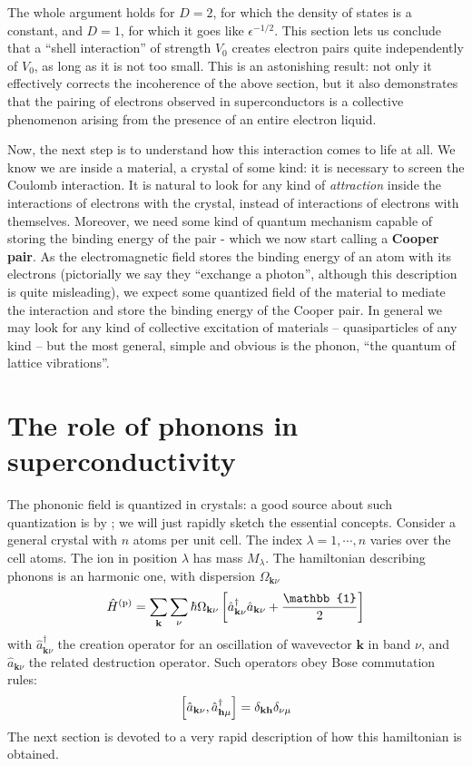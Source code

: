 The whole argument holds for $D=2$, for which the density of states is a constant, and $D=1$, for which it goes like $\epsilon^{-1/2}$. This section lets us conclude that a ``shell interaction'' of strength $V_0$ creates electron pairs quite independently of $V_0$, as long as it is not too small. This is an astonishing result: not only it effectively corrects the incoherence of the above section, but it also demonstrates that the pairing of electrons observed in superconductors is a collective phenomenon arising from the presence of an entire electron liquid.

Now, the next step is to understand how this interaction comes to life at all. We know we are inside a material, a crystal of some kind: it is necessary to screen the Coulomb interaction. It is natural to look for any kind of \textit{attraction} inside the interactions of electrons with the crystal, instead of interactions of electrons with themselves. Moreover, we need some kind of quantum mechanism capable of storing the binding energy of the pair - which we now start calling a \textbf{Cooper pair}. As the electromagnetic field stores the binding energy of an atom with its electrons (pictorially we say they ``exchange a photon'', although this description is quite misleading), we expect some quantized field of the material to mediate the interaction and store the binding energy of the Cooper pair. In general we may look for any kind of collective excitation of materials -- quasiparticles of any kind -- but the most general, simple and obvious is the phonon, ``the quantum of lattice vibrations''.

\section{The role of phonons in superconductivity}

The phononic field is quantized in crystals: a good source about such quantization is  \cite{grosso2000solid} by \citeauthor{grosso2000solid}; we will just rapidly sketch the essential concepts.
Consider a general crystal with $n$ atoms per unit cell. The index $\lambda = 1,\cdots,n$ varies over the cell atoms. The ion in position $\lambda$ has mass $M_\lambda$. The hamiltonian describing phonons is an harmonic one, with dispersion $\Omega_{\mathbf{k}\nu}$
\begin{equation}\label{eq:born-oppenheimer phonon hamiltonian}
	\hat H^{(\mathrm{p})} = \sum_\mathbf{k} \sum_\nu  \hbar \Omega_{\mathbf{k}\nu} \lrS{\hat a_{\mathbf{k}\nu}^\dagger \hat a_{\mathbf{k}\nu} + \frac{\mathbb{1}}{2}}
\end{equation}
with $\hat a_{\mathbf{k}\nu}^\dagger$ the creation operator for an oscillation of wavevector $\mathbf{k}$ in band $\nu$, and $\hat a_{\mathbf{k}\nu}$ the related destruction operator.  Such operators obey Bose commutation rules:
\[
	\comm{\hat a_{\mathbf{k}\nu}}{ \hat a_{\mathbf{h}\mu}^\dagger} = \delta_{\mathbf{k}\mathbf{h}}
	\delta_{\nu\mu}
\]
The next section is devoted to a very rapid description of how this hamiltonian is obtained.

